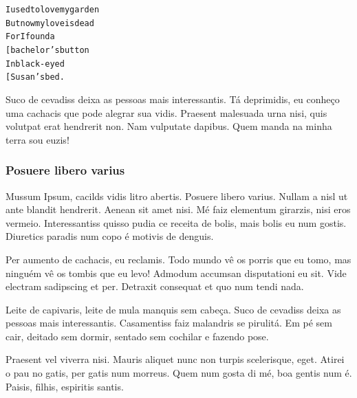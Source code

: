 \begin{alltt}\normalfont			%
I used to love my garden
But now my love is dead
   For I found a 
   			      		[ bachelor’s button
   In black-eyed 
              	        [ Susan’s bed.
\end{alltt}

Suco de cevadiss deixa as pessoas mais interessantis. Tá deprimidis, eu conheço
uma cachacis que pode alegrar sua vidis. Praesent malesuada urna nisi, quis
volutpat erat hendrerit non. Nam vulputate dapibus. Quem manda na minha terra
sou euzis!

\subsubsection{Posuere libero varius}

Mussum Ipsum, cacilds vidis litro abertis. Posuere libero varius. Nullam a nisl
ut ante blandit hendrerit. Aenean sit amet nisi. Mé faiz elementum girarzis,
nisi eros vermeio. Interessantiss quisso pudia ce receita de bolis, mais bolis
eu num gostis. Diuretics paradis num copo é motivis de denguis.

Per aumento de cachacis, eu reclamis. Todo mundo vê os porris que eu tomo, mas
ninguém vê os tombis que eu levo! Admodum accumsan disputationi eu sit. Vide
electram sadipscing et per. Detraxit consequat et quo num tendi nada.

Leite de capivaris, leite de mula manquis sem cabeça. Suco de cevadiss deixa as
pessoas mais interessantis. Casamentiss faiz malandris se pirulitá. Em pé sem
cair, deitado sem dormir, sentado sem cochilar e fazendo pose.

Praesent vel viverra nisi. Mauris aliquet nunc non turpis scelerisque, eget.
Atirei o pau no gatis, per gatis num morreus. Quem num gosta di mé, boa gentis
num é. Paisis, filhis, espiritis santis.

